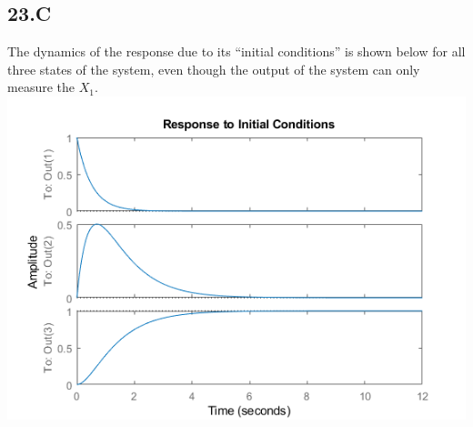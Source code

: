 \documentclass[12px]{article}
\begin{document}
\subsection*{23.C}

The dynamics of the response due to its ``initial conditions'' is shown below for all three states of the system, even though the output of the system can only measure the $X_1$. \\


\includegraphics{ss_sim}
\end{document}
